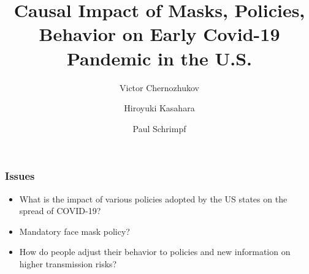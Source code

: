 \documentclass{beamer}
\title[Causal Impact of Masks, Policies, Behavior]
{Causal Impact of Masks, Policies, Behavior on Early Covid-19 Pandemic in the U.S.}
\author[Victor Chernozhukov, Hiroyuki Kasahara, Paul Schrimpf] %
{Victor Chernozhukov\inst{1} \and Hiroyuki Kasahara\inst{2} \and Paul Schrimpf\inst{2}}
\institute[] %
{
  \inst{1}%
  Department of Economics and Center for Statistics and Data Science, MIT
  \and
  \inst{2}%
  Vancouver School of Economics,
  UBC }
\date[July 2020] %
{}
\begin{document}
\begin{frame}
  \titlepage
\end{frame}





\begin{frame}
  \frametitle{Issues}%
\large
\begin{itemize}

\item What is the  impact of various policies adopted by the US states on the spread of COVID-19?\medskip
 
\item Mandatory face mask policy?\medskip

\item How do people adjust their behavior to policies and  new  information on higher transmission risks?
 
\end{itemize}

\end{frame}


 
\end{document}
